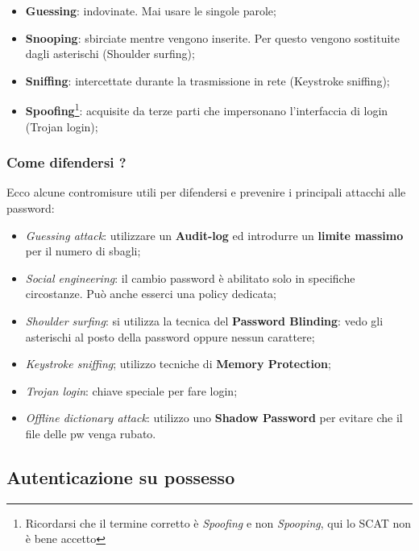 \begin{itemize}
      \item \textbf{Guessing}: indovinate. Mai usare le singole parole;
      \item \textbf{Snooping}: sbirciate mentre vengono inserite.
            Per questo vengono sostituite dagli asterischi
            (Shoulder surfing);
      \item \textbf{Sniffing}: intercettate durante la trasmissione in rete
            (Keystroke sniffing);
      \item \textbf{Spoofing}\footnote{Ricordarsi che il termine corretto è
                  \textit{Spoofing} e non \textit{Spooping}, qui lo SCAT non è bene
                  accetto }: acquisite da terze parti che impersonano
            l’interfaccia di login (Trojan login);

\end{itemize}

\subsubsection{Come difendersi ?}

Ecco alcune contromisure utili per difendersi e prevenire i principali attacchi
alle password:

\begin{itemize}
      \item \textit{Guessing attack}:
            utilizzare un \textbf{Audit-log} ed introdurre un
            \textbf{limite massimo} per il numero di sbagli;
      \item \textit{Social engineering}: il cambio password è abilitato solo in
            specifiche circostanze.
            Può anche esserci una policy dedicata;
      \item \textit{Shoulder surfing}: si utilizza la tecnica del
            \textbf{Password Blinding}: vedo gli asterischi al posto della
            password oppure nessun carattere;
      \item \textit{Keystroke sniffing}; utilizzo tecniche di
            \textbf{Memory Protection};
      \item \textit{Trojan login}: chiave speciale per fare login;
      \item \textit{Offline dictionary attack}: utilizzo uno
            \textbf{Shadow Password} per evitare che
            il file delle pw venga rubato.
\end{itemize}

\subsection{Autenticazione su possesso}

